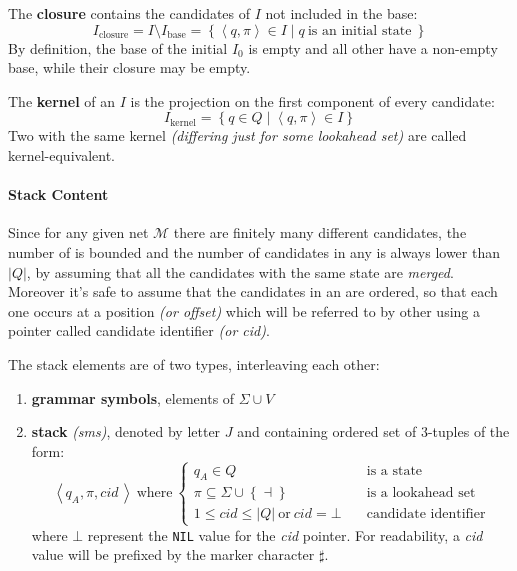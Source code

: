 \documentclass[english]{article}
\begin{document}
\begin{definition}
  The \textbf{closure} contains the candidates of \(I\) not included in the base:
  \[ I_{\text{closure}} = I \setminus I_{\text{base}} = \left\{ \left\langle q , \pi \right\rangle \in I \mid q \ \text{is an initial state} \ \right\} \]
  By definition, the base of the initial \mstate \(I_0\) is empty and all other \mstates have a non-empty base, while their closure may be empty.
\end{definition}

\begin{definition}
  The \textbf{kernel} of an \mstate \(I\) is the projection on the first component of every candidate:
  \[ I_{\text{kernel}} = \left\{ q \in Q \mid \left\langle q, \pi \right\rangle \in I \right\} \]
  Two \mstates with the same kernel \textit{(differing just for some lookahead set)} are called kernel-equivalent.
\end{definition}

\paragraph{Stack Content}
\label{par:stack-content}

Since for any given net \(\mathcal{M}\) there are finitely many different candidates, the number of \mstates is bounded and the number of candidates in any \mstate is always lower than \(| Q |\), by assuming that all the candidates with the same state are \textit{merged}.
Moreover it's safe to assume that the candidates in an \mstate are ordered, so that each one occurs at a position \textit{(or offset)} which will be referred to by other \mstates using a pointer called candidate identifier \textit{(or cid)}.

The stack elements are of two types, interleaving each other:

\begin{enumerate}
  \item \textbf{grammar symbols}, elements of \(\Sigma \cup V\)
  \item \textbf{stack \mstates} \textit{(sms)}, denoted by letter \(J\) and containing ordered set of \(3\)-tuples of the form:
        \[ \left\langle q_A, \pi, \textit{cid} \, \right\rangle \ \text{where} \ \begin{cases}
            q_A \in Q \quad                                                        & \text{is a state}           \\
            \pi \subseteq \Sigma \cup \left\{ \dashv \right\} \quad                & \text{is a lookahead set}   \\
            1 \leq \textit{cid} \leq | Q | \ \text{or} \ \textit{cid} = \bot \quad & \text{candidate identifier}
          \end{cases} \]
        where \(\bot\) represent the \texttt{NIL} value for the \textit{cid} pointer.
        For readability, a \textit{cid} value will be prefixed by the marker character \(\sharp\).
\end{enumerate}
\end{document}
